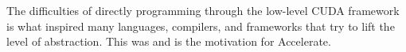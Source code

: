 The difficulties of directly programming through the low-level CUDA framework is what inspired many languages, compilers, and frameworks that try to lift the level of abstraction. This was and is the motivation for Accelerate.



%






